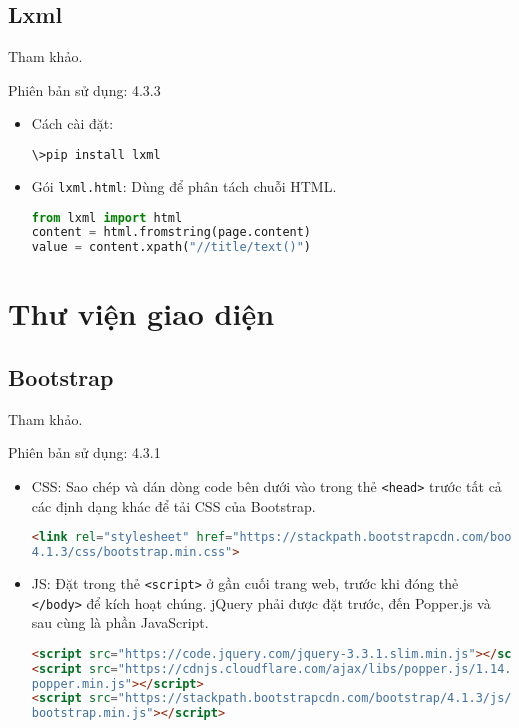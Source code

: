\subsection{Lxml}
Tham khảo\cite{lxml}.
\par
Phiên bản sử dụng: 4.3.3
\begin{itemize}
	\item Cách cài đặt:
	\begin{lstlisting}[language=bash]
\>pip install lxml
	\end{lstlisting}
	\item Gói \texttt{lxml.html}: Dùng để phân tách chuỗi HTML.
	\begin{lstlisting}[language=Python]
from lxml import html
content = html.fromstring(page.content)
value = content.xpath("//title/text()")
	\end{lstlisting}
\end{itemize}
\section{Thư viện giao diện}
\subsection{Bootstrap}
Tham khảo\cite{bootstrap}.
\par
Phiên bản sử dụng: 4.3.1
\begin{itemize}
 	\item CSS: Sao chép và dán dòng code bên dưới vào trong thẻ \texttt{<head>} trước tất cả các định dạng khác để tải CSS của Bootstrap.
 	\begin{lstlisting}[language=HTML]
<link rel="stylesheet" href="https://stackpath.bootstrapcdn.com/bootstrap/
4.1.3/css/bootstrap.min.css">
	\end{lstlisting}
	\item JS: Đặt trong thẻ \texttt{<script>} ở gần cuối trang web, trước khi đóng thẻ \texttt{</body>} để kích hoạt chúng. jQuery phải được đặt trước, đến Popper.js và sau cùng là phần JavaScript.
	\begin{lstlisting}[language=HTML]
<script src="https://code.jquery.com/jquery-3.3.1.slim.min.js"></script>
<script src="https://cdnjs.cloudflare.com/ajax/libs/popper.js/1.14.3/umd/
popper.min.js"></script>
<script src="https://stackpath.bootstrapcdn.com/bootstrap/4.1.3/js/
bootstrap.min.js"></script>
	\end{lstlisting}
\end{itemize}
